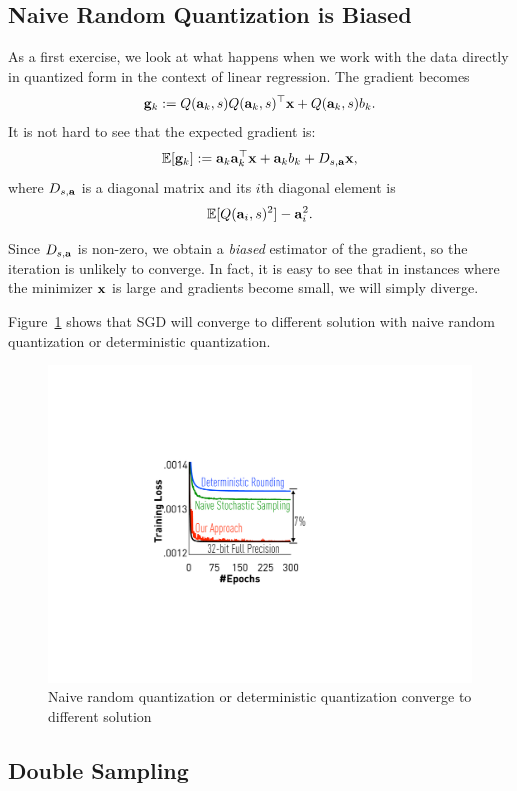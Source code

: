 \documentclass{article}
\def\a{{\bf a}}
\def\g{{\bf g}}
\def\x{{\bf x}}
\def\E{\mathbb{E}}
\begin{document}
\subsection{Naive Random Quantization is Biased}

As a first exercise, we look at what happens when we work with the data directly in quantized form in the context of linear regression. 
The gradient becomes
\[
\g_k := Q(\a_k, s ) Q(\a_k, s)^\top \x + Q(\a_k, s) b_k.
\]
It is not hard to see that the expected gradient is: 
\[
\E[\g_k] := \a_k \a_k^\top \x + \a_k b_k + D_{s, \a} \x, 
\]
where $D_{s, \a}$ is a diagonal matrix and its $i$th diagonal element is 
\[
\E[ Q(\a_i, s)^2 ] - \a_i^2.
\]

Since $D_{s, \a}$ is non-zero, we obtain a \emph{biased} estimator of the gradient, so the iteration is unlikely to converge. 
In fact, it is easy to see that in instances where the minimizer $\x$ is large and gradients become small, we will simply diverge. 

Figure~\ref{fig:gap} shows that SGD will converge to different solution with naive random quantization or deterministic quantization.
\begin{figure}[h]
\centering    
\includegraphics[width=\columnwidth]{micro-experiments/gap} 
\caption{Naive random quantization or deterministic quantization converge to different solution}
\label{fig:gap}
\end{figure} 

\subsection{Double Sampling}
\end{document}
